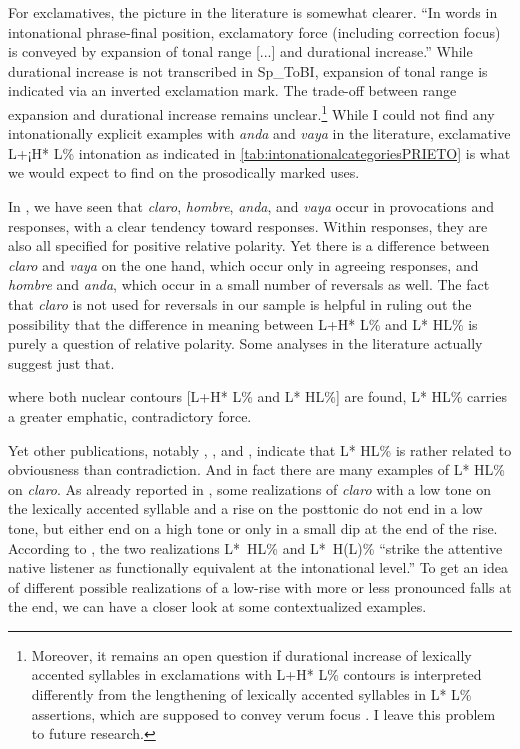 For exclamatives, the picture in the literature is somewhat clearer. ``In words in intonational phrase-final position, exclamatory force (including correction focus) is conveyed by expansion of tonal range [...] and durational increase.'' \citep[368]{HualdePrieto2015} While durational increase is not transcribed in Sp\_ToBI, expansion of tonal range is indicated via an inverted exclamation mark. The trade-off between range expansion and durational increase remains unclear.\footnote{Moreover, it remains an open question if durational increase of lexically accented syllables in exclamations with L+H* L\% contours is interpreted differently from the lengthening of lexically accented syllables in L* L\% assertions, which are supposed to convey verum focus \citep{EscandellVidal.2011}. I leave this problem to future research.} While I could not find any intonationally explicit examples with \textit{anda} and \textit{vaya} in the literature, exclamative L+¡H* L\% intonation as indicated in \autoref{tab:intonationalcategoriesPRIETO} is what we would expect to find on the prosodically marked uses.

In , we have seen that \textit{claro}, \textit{hombre}, \textit{anda}, and \textit{vaya} occur in provocations and responses, with a clear tendency toward responses. Within responses, they are also all specified for positive relative polarity. Yet there is a difference between \textit{claro} and \textit{vaya} on the one hand, which occur only in agreeing responses, and \textit{hombre} and \textit{anda}, which occur in a small number of reversals as well. The fact that \textit{claro} is not used for reversals in our sample is helpful in ruling out the possibility that the difference in meaning between L+H* L\% and L* HL\% is purely a question of relative polarity. Some analyses in the literature actually suggest just that.

\begin{displayquote}\relax
[In varieties] where both nuclear contours [L+H* L\% and L* HL\%] are found, L* HL\% carries a greater emphatic, contradictory force. \citep[369]{HualdePrieto2015}
\end{displayquote}

Yet other publications, notably \citet[279]{EstebasVilaplanaPrieto.2008}, \citet{ElviraGarcia.2016}, and \citet{TorreiraGrice.2018}, indicate that L* HL\% is rather related to obviousness than contradiction. And in fact there are many examples of L* HL\% on \textit{claro}. As already reported in \citet{TorreiraGrice.2018}, some realizations of \textit{claro} with a low tone on the lexically accented syllable and a rise on the posttonic do not end in a low tone, but either end on a high tone or only in a small dip at the end of the rise. According to \citet[16]{TorreiraGrice.2018}, the two realizations L*~HL\% and L*~H(L)\% ``strike the attentive native listener as functionally
equivalent at the intonational level.'' To get an idea of different possible realizations of a low-rise with more or less pronounced falls at the end, we can have a closer look at some contextualized examples. 


